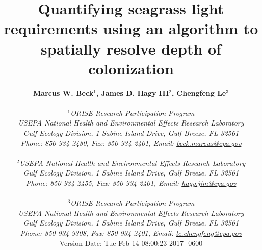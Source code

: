 \documentclass[letterpaper,12pt,oneside]{article}\usepackage[]{graphicx}\usepackage[]{color}
\begin{document}
\raggedbottom
\linenumbers
\raggedright
{}
\setlength{\parindent}{0.5in}
\renewcommand\refname{References \vspace{12pt}}

\begin{singlespace}
\title{{\bf {\Large Quantifying seagrass light requirements using an algorithm to spatially resolve depth of colonization}}}
\author{
  {\bf {\normalsize Marcus W. Beck$^1$, James D. Hagy III$^2$, Chengfeng Le$^3$}}
  \\\\{\textit {\normalsize $^1$ORISE Research Participation Program}}
  \\{\textit {\normalsize USEPA National Health and Environmental Effects Research Laboratory}}
  \\{\textit {\normalsize Gulf Ecology Division, 1 Sabine Island Drive, Gulf Breeze, FL 32561}}
	\\{\textit {\normalsize Phone: 850-934-2480, Fax: 850-934-2401, Email: \href{mailto:beck.marcus@epa.gov}{beck.marcus@epa.gov}}}
  \\\\{\textit {\normalsize $^2$USEPA National Health and Environmental Effects Research Laboratory}}
	\\{\textit {\normalsize Gulf Ecology Division, 1 Sabine Island Drive, Gulf Breeze, FL 32561}}
	\\{\textit {\normalsize Phone: 850-934-2455, Fax: 850-934-2401, Email: \href{mailto:hagy.jim@epa.gov}{hagy.jim@epa.gov}}}
  \\\\{\textit {\normalsize $^3$ORISE Research Participation Program}}
  \\{\textit {\normalsize USEPA National Health and Environmental Effects Research Laboratory}}
  \\{\textit {\normalsize Gulf Ecology Division, 1 Sabine Island Drive, Gulf Breeze, FL 32561}}
  \\{\textit {\normalsize Phone: 850-934-9308, Fax: 850-934-2401, Email: \href{mailto:le.chengfeng@epa.gov}{le.chengfeng@epa.gov}}}
  \vspace{1in} 
  \\ Version Date:   Tue Feb 14 08:00:23 2017 -0600
	}
\date{}
\maketitle
\end{singlespace}
\clearpage
\end{document}
